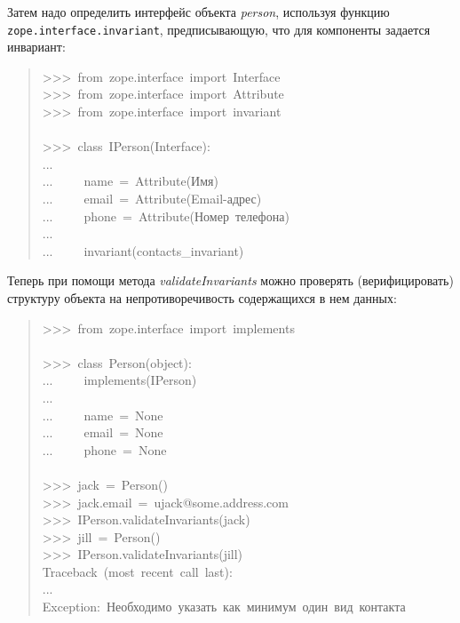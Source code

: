 \documentclass[a4paper,openany,twoside,final]{book}
\providecommand*{\DUroletitlereference}[1]{\textsl{#1}}
\begin{document}
Затем надо определить интерфейс объекта \DUroletitlereference{person}, используя функцию
\texttt{zope.interface.invariant}, предписывающую, что для компоненты
задается инвариант:

\begin{quote}{\ttfamily \raggedright \noindent
>{}>{}>~from~zope.interface~import~Interface\\
>{}>{}>~from~zope.interface~import~Attribute\\
>{}>{}>~from~zope.interface~import~invariant\\
~\\
>{}>{}>~class~IPerson(Interface):\\
...\\
...~~~~~name~=~Attribute(\textquotedbl{}Имя\textquotedbl{})\\
...~~~~~email~=~Attribute(\textquotedbl{}Email-адрес\textquotedbl{})\\
...~~~~~phone~=~Attribute(\textquotedbl{}Номер~телефона\textquotedbl{})\\
...\\
...~~~~~invariant(contacts\_invariant)
}
\end{quote}

Теперь при помощи метода \DUroletitlereference{validateInvariants} можно проверять
(верифицировать) структуру объекта на непротиворечивость содержащихся
в нем данных:

\begin{quote}{\ttfamily \raggedright \noindent
>{}>{}>~from~zope.interface~import~implements\\
~\\
>{}>{}>~class~Person(object):\\
...~~~~~implements(IPerson)\\
...\\
...~~~~~name~=~None\\
...~~~~~email~=~None\\
...~~~~~phone~=~None\\
~\\
>{}>{}>~jack~=~Person()\\
>{}>{}>~jack.email~=~u\textquotedbl{}jack@some.address.com\textquotedbl{}\\
>{}>{}>~IPerson.validateInvariants(jack)\\
>{}>{}>~jill~=~Person()\\
>{}>{}>~IPerson.validateInvariants(jill)\\
Traceback~(most~recent~call~last):\\
...\\
Exception:~\textquotedbl{}Необходимо~указать~как~минимум~один~вид~контакта\textquotedbl{}
}
\end{quote}
\end{document}
